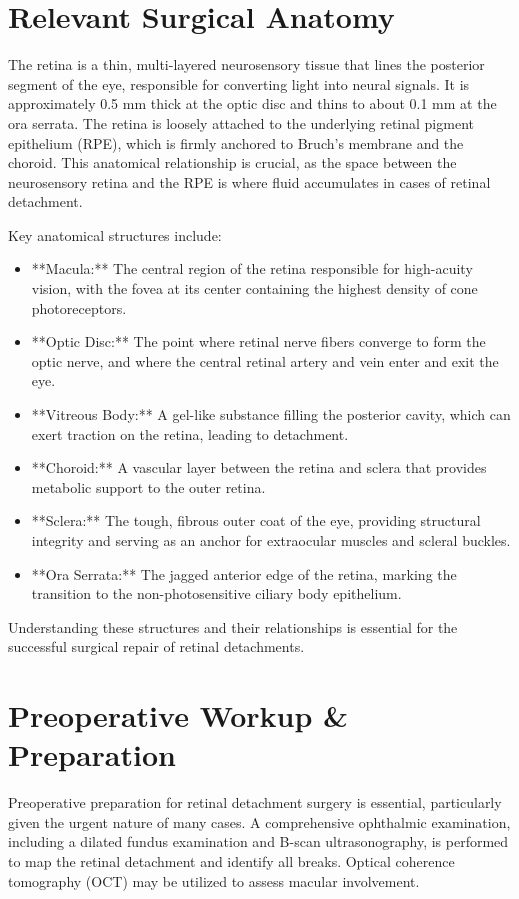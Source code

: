 \section*{Relevant Surgical Anatomy}
The retina is a thin, multi-layered neurosensory tissue that lines the posterior segment of the eye, responsible for converting light into neural signals. It is approximately 0.5 mm thick at the optic disc and thins to about 0.1 mm at the ora serrata. The retina is loosely attached to the underlying retinal pigment epithelium (RPE), which is firmly anchored to Bruch's membrane and the choroid. This anatomical relationship is crucial, as the space between the neurosensory retina and the RPE is where fluid accumulates in cases of retinal detachment.

Key anatomical structures include:

\begin{itemize}
  \item **Macula:** The central region of the retina responsible for high-acuity vision, with the fovea at its center containing the highest density of cone photoreceptors.
  \item **Optic Disc:** The point where retinal nerve fibers converge to form the optic nerve, and where the central retinal artery and vein enter and exit the eye.
  \item **Vitreous Body:** A gel-like substance filling the posterior cavity, which can exert traction on the retina, leading to detachment.
  \item **Choroid:** A vascular layer between the retina and sclera that provides metabolic support to the outer retina.
  \item **Sclera:** The tough, fibrous outer coat of the eye, providing structural integrity and serving as an anchor for extraocular muscles and scleral buckles.
  \item **Ora Serrata:** The jagged anterior edge of the retina, marking the transition to the non-photosensitive ciliary body epithelium.
\end{itemize}

Understanding these structures and their relationships is essential for the successful surgical repair of retinal detachments.

\section*{Preoperative Workup \& Preparation}
Preoperative preparation for retinal detachment surgery is essential, particularly given the urgent nature of many cases. A comprehensive ophthalmic examination, including a dilated fundus examination and B-scan ultrasonography, is performed to map the retinal detachment and identify all breaks. Optical coherence tomography (OCT) may be utilized to assess macular involvement.

